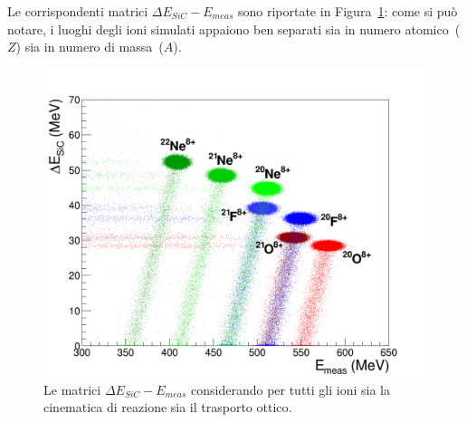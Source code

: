 





Le corrispondenti matrici $\Delta E_{SiC} - E_{meas}$ sono riportate in Figura~\ref{fig:deltaE_Emeas_PID}: come si può notare, i luoghi degli ioni simulati appaiono ben separati sia in numero atomico~($Z$) sia in numero di massa~($A$).
\begin{figure} [!p]
	\centering
	\includegraphics[width=\textwidth, keepaspectratio]{Grafici_Tesi2/PIDnew/deltaE_Emeas_quadrata_menoeventi2.png}
	\caption{Le matrici $\Delta E_{SiC} - E_{meas}$ considerando per tutti gli ioni sia la cinematica di reazione sia il trasporto ottico.} \label{fig:deltaE_Emeas_PID}
\end{figure}
